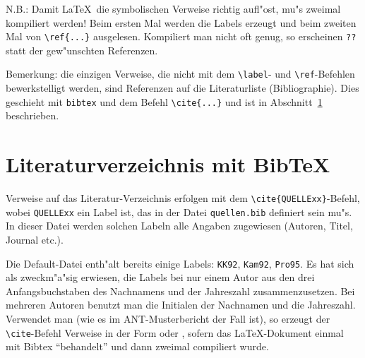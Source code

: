 N.B.: Damit \LaTeX\ die symbolischen Verweise richtig aufl"ost,
mu"s zweimal kompiliert werden! Beim ersten Mal werden die Labels erzeugt und
beim zweiten Mal von \verb+\ref{...}+ ausgelesen. Kompiliert man nicht oft genug,
so erscheinen {\tt ??} statt der gew"unschten Referenzen.

Bemerkung: die einzigen Verweise, die nicht mit dem \verb+\label+- 
und \verb+\ref+-Befehlen bewerkstelligt werden, sind Referenzen auf die Literaturliste
(Bibliographie). Dies geschieht mit {\tt bibtex} und dem Befehl \verb+\cite{...}+
und ist in Abschnitt~\ref{SECbib} beschrieben.

\section{Literaturverzeichnis mit BibTeX} \label{SECbib}
%
Verweise auf das Literatur-Verzeichnis erfolgen mit dem
\verb+\cite{QUELLExx}+-Befehl, wobei {\tt QUELLExx} ein Label ist, das in der
Datei {\tt quellen.bib} definiert sein mu"s.  In dieser Datei werden
solchen Labeln alle Angaben zugewiesen (Autoren, Titel, Journal etc.).

Die Default-Datei enth"alt bereits einige Labels: {\tt KK92}, {\tt Kam92}, {\tt Pro95}.
Es hat sich als zweckm"a"sig erwiesen, die Labels bei nur einem Autor aus den drei Anfangsbuchstaben
des Nachnamens und der Jahreszahl zusammenzusetzen. Bei mehreren Autoren benutzt man die
Initialen der Nachnamen und die Jahreszahl.
Verwendet man \verb++ (wie es im ANT-Musterbericht der Fall ist),
so erzeugt der \verb+\cite+-Befehl Verweise in der Form \cite{KK92,Kam92} oder \cite{Pro95},
sofern das \LaTeX-Dokument einmal mit Bibtex ``behandelt'' und dann zweimal compiliert wurde.

